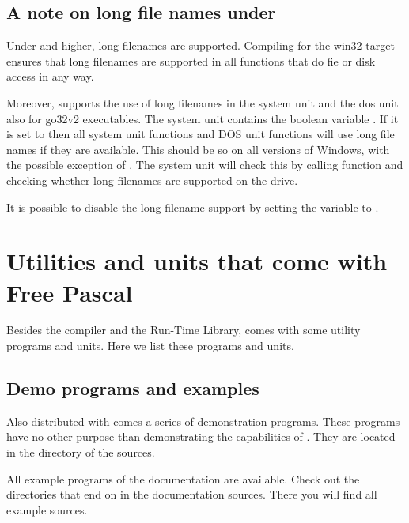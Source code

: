 \documentclass{report}
\begin{document}
\section{A note on long file names under \dos}
Under  and higher, long filenames are supported. Compiling
for the win32 target ensures that long filenames are supported in all
functions that do fie or disk access in any way.

Moreover, \fpc supports the use of long filenames in the system unit and
the dos unit also for go32v2 executables. The system unit contains the
boolean variable . If it is set to  then all
system unit functions and DOS unit functions will use long file names
if they are available. This should be so on all versions of Windows,
with the possible exception of . The system unit will check
this by calling \dos function  and checking whether long
filenames are supported on the  drive.

It is possible to disable the long filename support by setting the
 variable to .


\chapter{Utilities and units that come with Free Pascal}
\label{ch:Utilities}
Besides the compiler and the Run-Time Library, \fpc comes with some utility
programs and units. Here we list these programs and units.

\section{Demo programs and examples}
Also distributed with \fpc comes a series of demonstration programs.
These programs have no other purpose than demonstrating the capabilities of
\fpc. They are located in the  directory of the sources.

All example programs of the documentation are available. Check out the
directories that end on  in the documentation sources. There you
will find all example sources.
\end{document}

